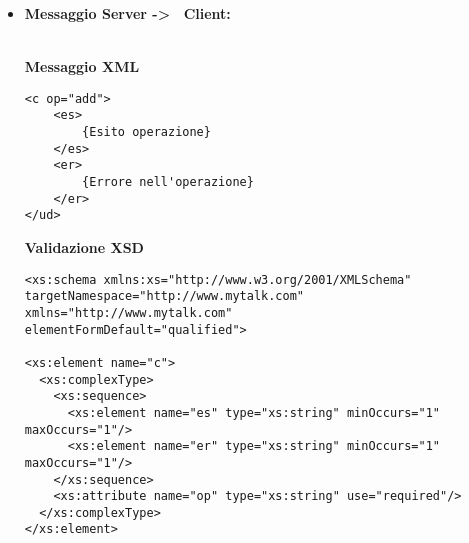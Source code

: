 {{\begin{itemize}
{\begin{lstlisting}
<xs:element name="c">
  <xs:complexType>
    <xs:sequence>
      <xs:element name="us" type="emailAddress" minOccurs="1" maxOccurs="1"/>
      <xs:element name="ur" type="emailAddress" minOccurs="1" maxOccurs="1"/>
      <xs:element name="pk" type="xs:long" minOccurs="1" maxOccurs="1"/>
      <xs:element name="pkL" type="xs:long" minOccurs="1" maxOccurs="1"/>
      <xs:element name="ss" type="xs:long" minOccurs="1" maxOccurs="1"/>
      <xs:element name="ds" type="dateType" minOccurs="1" maxOccurs="1"/>
      <xs:element name="de" type="dateType" minOccurs="1" maxOccurs="1"/>
      <xs:element name="sg" type="grade" minOccurs="1" maxOccurs="1"/>
      <xs:element name="rg" type="grade" minOccurs="1" maxOccurs="1"/>
    </xs:sequence>
    <xs:attribute name="op" type="xs:string" use="required"/>
    <xs:attribute name="type" type="xs:string" use="required"/>
  </xs:complexType>
</xs:element>

<xs:simpleType name="emailAddress"> 
    <xs:restriction base="xs:string"> 
      <xs:pattern value="[^@]+@[^\.]+\..+"/> 
    </xs:restriction> 
</xs:simpleType>

<xs:simpleType name="dateType">
   <xs:restriction base="xs:string">
       <xs:pattern value="\d{14}"/>
   </xs:restriction>
</xs:simpleType>

<xs:simpleType name="grade">
   <xs:restriction base="xs:byte">
       <xs:minInclusive value="0"/>
       <xs:maxInclusive value="5"/>
   </xs:restriction>
</xs:simpleType>

</xs:schema>
				\end{lstlisting}
				}
				
				\item[] \textbf{Messaggio Server -\textgreater~ Client:}{\\
				\textbf{Messaggio XML}\\
				\begin{lstlisting}
<c op="add">
	<es>
		{Esito operazione}
	</es>
	<er>
		{Errore nell'operazione}
	</er>
</ud>
				\end{lstlisting}
				\textbf{Validazione XSD}\\
				\begin{lstlisting}
<xs:schema xmlns:xs="http://www.w3.org/2001/XMLSchema"
targetNamespace="http://www.mytalk.com"
xmlns="http://www.mytalk.com"
elementFormDefault="qualified">

<xs:element name="c">
  <xs:complexType>
    <xs:sequence>
      <xs:element name="es" type="xs:string" minOccurs="1" maxOccurs="1"/>
      <xs:element name="er" type="xs:string" minOccurs="1" maxOccurs="1"/>
    </xs:sequence>
    <xs:attribute name="op" type="xs:string" use="required"/>
  </xs:complexType>
</xs:element>


\end{lstlisting}}
\end{itemize}}}
